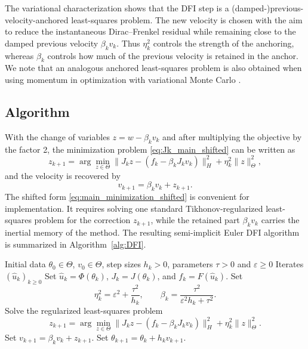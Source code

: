\documentclass[oneside,11pt]{article}
\theoremstyle{remark}
\theoremstyle{thmstyleone}
\theoremstyle{thmstylethree}
\theoremstyle{thmstyletwo}
\newcommand{\norm}[1]{\lVert #1\rVert}
\begin{document}
The variational characterization shows that the DFI step is a (damped-)previous-velocity-anchored least-squares problem.  The new velocity is chosen with the aim to reduce the instantaneous Dirac--Frenkel residual while remaining close to the damped previous velocity $\beta_kv_k$.  Thus $\eta_k^2$ controls the strength of the anchoring, whereas $\beta_k$ controls how much of the previous velocity is retained in the anchor. We note that an analogous anchored least-squares problem is also obtained when using momentum in optimization with variational Monte Carlo  \cite{GOLDSHLAGER2024113351}.

\subsection{Algorithm}
With the change of variables $z=w-\beta_kv_k$ and after multiplying the objective by the factor 2, the minimization problem \eqref{eq:Jk_main_shifted} can be written as
\begin{equation}
  z_{k+1}
  =
  \arg\min_{z\in \Theta}
    \norm{J_k z -(f_k - \beta_k J_k v_k)}_H^2
    +
    \eta_k^2\norm{z}_\Theta^2
  ,
  \label{eq:main_minimization_shifted}
\end{equation}
and the velocity is recovered by
\[
  v_{k+1}=\beta_k v_k+z_{k+1}.
\]
The shifted form \eqref{eq:main_minimization_shifted} is convenient for implementation. It requires solving one standard Tikhonov-regularized least-squares problem for the correction $z_{k+1}$, while the retained part $\beta_kv_k$ carries the inertial memory of the method. The resulting semi-implicit Euler DFI algorithm is summarized in Algorithm~\ref{alg:DFI}.

\begin{algorithm}
  \caption{Semi-implicit Euler Dirac--Frenkel dynamics with inertia (DFI)}\label{alg:DFI}
  \begin{algorithmic}[1]
    \Require Initial data $\theta_0\in\Theta$, $v_0\in\Theta$, step sizes $h_k>0$, parameters $\tau>0$ and $\varepsilon\geq 0$
    \Ensure Iterates $(\hat u_k)_{k\geq 0}$
      \State Set $\hat u_k=\Phi(\theta_k)$, $J_k=J(\theta_k)$, and $f_k=F(\hat u_k)$.
      \State Set
      \[
        \eta_k^2=\varepsilon^2+\frac{\tau^2}{h_k},
        \qquad
        \beta_k=\frac{\tau^2}{\varepsilon^2h_k+\tau^2}.
      \]
      \State Solve the regularized least-squares problem
      \[
        z_{k+1}
        =
        \arg\min_{z\in\Theta}
          \norm{J_k z-(f_k-\beta_k J_kv_k)}_H^2
          +
          \eta_k^2\norm{z}_\Theta^2.
      \]
      \State Set $v_{k+1}=\beta_k v_k+z_{k+1}$.
      \State Set $\theta_{k+1}=\theta_k+h_kv_{k+1}$.
    \EndFor
  \end{algorithmic}
\end{algorithm}
\end{document}
